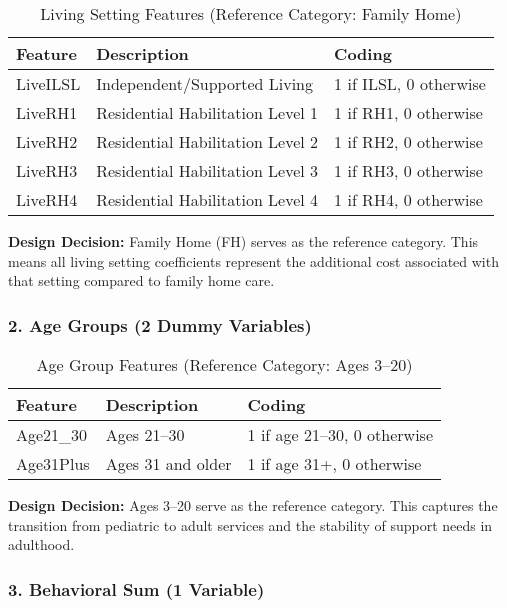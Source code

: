 \begin{table}[ht]
\centering
\caption{Living Setting Features (Reference Category: Family Home)}
\begin{tabular}{lll}
\toprule
\textbf{Feature} & \textbf{Description} & \textbf{Coding} \\
\midrule
LiveILSL & Independent/Supported Living & 1 if ILSL, 0 otherwise \\
LiveRH1 & Residential Habilitation Level 1 & 1 if RH1, 0 otherwise \\
LiveRH2 & Residential Habilitation Level 2 & 1 if RH2, 0 otherwise \\
LiveRH3 & Residential Habilitation Level 3 & 1 if RH3, 0 otherwise \\
LiveRH4 & Residential Habilitation Level 4 & 1 if RH4, 0 otherwise \\
\bottomrule
\end{tabular}
\end{table}

\textbf{Design Decision:} Family Home (FH) serves as the reference category. This means all living setting coefficients represent the additional cost associated with that setting compared to family home care.

\subsubsection{2. Age Groups (2 Dummy Variables)}

\begin{table}[ht]
\centering
\caption{Age Group Features (Reference Category: Ages 3--20)}
\begin{tabular}{lll}
\toprule
\textbf{Feature} & \textbf{Description} & \textbf{Coding} \\
\midrule
Age21\_30 & Ages 21--30 & 1 if age 21--30, 0 otherwise \\
Age31Plus & Ages 31 and older & 1 if age 31+, 0 otherwise \\
\bottomrule
\end{tabular}
\end{table}

\textbf{Design Decision:} Ages 3--20 serve as the reference category. This captures the transition from pediatric to adult services and the stability of support needs in adulthood.

\subsubsection{3. Behavioral Sum (1 Variable)}

